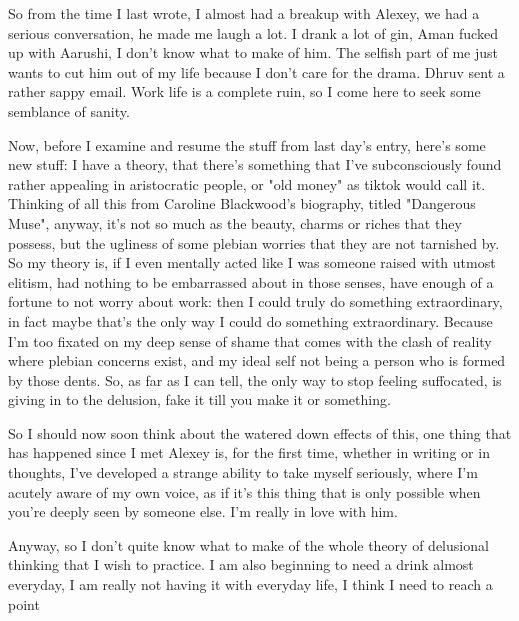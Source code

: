 \noindent {}

So from the time I last wrote, I almost had a breakup with Alexey, we had a serious conversation, he made me laugh a lot. I drank a lot of gin, Aman fucked up with Aarushi, I don't know what to make of him. The selfish part of me just wants to cut him out of my life because I don't care for the drama. Dhruv sent a rather sappy email. Work life is a complete ruin, so I come here to seek some semblance of sanity.

Now, before I examine and resume the stuff from last day's entry, here's some new stuff: I have a theory, that there's something that I've subconsciously found rather appealing in aristocratic people, or "old money" as tiktok would call it. Thinking of all this from Caroline Blackwood's biography, titled "Dangerous Muse", anyway, it's not so much as the beauty, charms or riches that they possess, but the ugliness of some plebian worries that they are not tarnished by. So my theory is, if I even mentally acted like I was someone raised with utmost elitism, had nothing to be embarrassed about in those senses, have enough of a fortune to not worry about work: then I could truly do something extraordinary, in fact maybe that's the only way I could do something extraordinary. Because I'm too fixated on my deep sense of shame that comes with the clash of reality where plebian concerns exist, and my ideal self not being a person who is formed by those dents. So, as far as I can tell, the only way to stop feeling suffocated, is giving in to the delusion, fake it till you make it or something. 

So I should now soon think about the watered down effects of this, one thing that has happened since I met Alexey is, for the first time, whether in writing or in thoughts, I've developed a strange ability to take myself seriously, where I'm acutely aware of my own voice, as if it's this thing that is only possible when you're deeply seen by someone else. I'm really in love with him. 

Anyway, so I don't quite know what to make of the whole theory of delusional thinking that I wish to practice. I am also beginning to need a drink almost everyday, I am really not having it with everyday life, I think I need to reach a point 